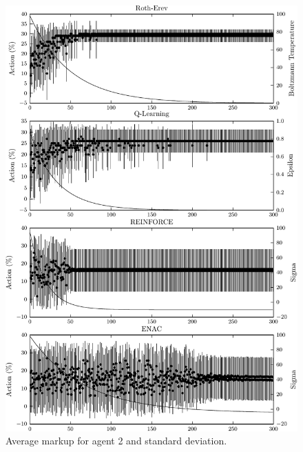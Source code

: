 {\begin{figure}
	  \centering
	  \includegraphics{figures/fig5_2_action_a2}
	  \caption{Average markup for agent 2 and standard deviation.}
	  \label{fig:5_2_action_a2}
	\end{figure}
	\begin{figure}
	  \centering

\end{figure}}
